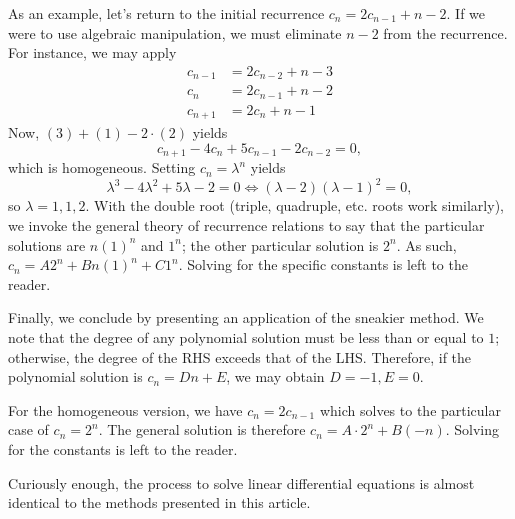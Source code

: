 \documentclass{article}
\begin{document}
As an example, let's return to the initial recurrence $c_n = 2c_{n-1} + n-2.$ If we were to use algebraic manipulation, we must eliminate $n-2$ from the recurrence. For instance, we may apply 
\begin{align}
    c_{n-1} &= 2c_{n-2} + n-3 \tag{1} \\
    c_{n} &= 2c_{n-1} + n-2 \tag{2} \\
    c_{n+1} &= 2c_{n} + n-1 \tag{3} 
\end{align}
Now, $(3) + (1) - 2 \cdot (2)$ yields
\[ c_{n+1}-4c_{n}+5c_{n-1}-2c_{n-2} = 0, \]
which is homogeneous. Setting $c_n = \lambda^n$ yields
\[\lambda^3 - 4\lambda^2 + 5\lambda -2 = 0 \Longleftrightarrow (\lambda - 2)(\lambda-1)^2 = 0,\]
so $\lambda = 1,1,2$. With the double root (triple, quadruple, etc. roots work similarly), we invoke the general theory of recurrence relations to say that the particular solutions are $n(1)^n$ and $1^n$; the other particular solution is $2^n.$ As such, $c_n = A2^n + Bn(1)^n + C1^n$. Solving for the specific constants is left to the reader. 

Finally, we conclude by presenting an application of the sneakier method. We note that the degree of any polynomial solution must be less than or equal to $1$; otherwise, the degree of the RHS exceeds that of the LHS. Therefore, if the polynomial solution is $c_n = Dn + E$, we may obtain $D = -1, E = 0.$ 

For the homogeneous version, we have $c_n = 2c_{n-1}$ which solves to the particular case of $c_n = 2^n$. The general solution is therefore $c_n = A\cdot 2^n + B(-n).$ Solving for the constants is left to the reader.

Curiously enough, the process to solve linear differential equations is almost identical to the methods presented in this article. 
\end{document}
